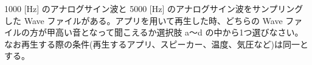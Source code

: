 1000 [Hz] のアナログサイン波と 5000 [Hz] のアナログサイン波をサンプリングした Wave ファイルがある。アプリを用いて再生した時、どちらの Wave ファイルの方が甲高い音となって聞こえるか選択肢 a〜d の中から1つ選びなさい。なお再生する際の条件(再生するアプリ、スピーカー、温度、気圧など)は同一とする。

